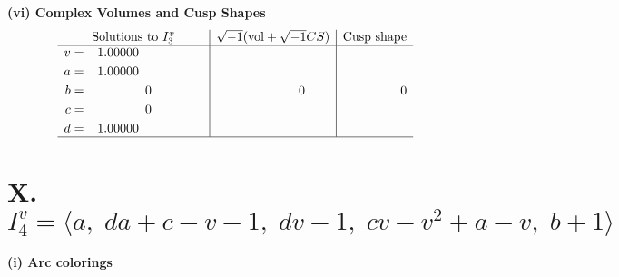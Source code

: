 \documentclass[1p]{elsarticle_modified}
\theoremstyle{definition}
\newcommand{\I}{\sqrt{-1}}
\begin{document}
\newpage\flushleft \textbf{(vi) Complex Volumes and Cusp Shapes}
$$\begin{array}{c|c|c}  
\text{Solutions to }I^v_{3}& \I (\text{vol} + \sqrt{-1}CS) & \text{Cusp shape}\\
 \hline 
\begin{aligned}
v &= \phantom{-}1.00000\phantom{ +0.000000I} \\
a &= \phantom{-}1.00000\phantom{ +0.000000I} \\
b &= \phantom{-0.000000 } 0 \\
c &= \phantom{-0.000000 } 0 \\
d &= \phantom{-}1.00000\phantom{ +0.000000I}\end{aligned}
 & \phantom{-0.000000 } 0 & \phantom{-0.000000 } 0\\
 \hline 
 \end{array}$$\newpage\newpage\renewcommand{\arraystretch}{1}
\centering \section*{X. $I^v_{4}= \langle a,\;d a+c- v-1,\;d v-1,\;c v- v^2+a- v,\;b+1 \rangle$}
\flushleft \textbf{(i) Arc colorings}\\
\end{document}
